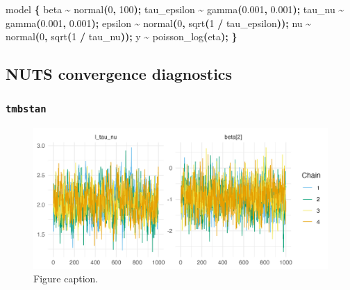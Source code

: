 \documentclass[a4paper, nobind]{templates/ociamthesis}
\newenvironment{Shaded}{\begin{snugshade}}{\end{snugshade}}
\newcommand{\DecValTok}[1]{\textcolor[rgb]{0.00,0.00,0.81}{#1}}
\newcommand{\FloatTok}[1]{\textcolor[rgb]{0.00,0.00,0.81}{#1}}
\newcommand{\NormalTok}[1]{#1}
\newcommand{\OperatorTok}[1]{\textcolor[rgb]{0.81,0.36,0.00}{\textbf{#1}}}
\renewenvironment{Shaded}
{
  \vspace{10pt}%
  \begin{snugshade}%
}{%
  \end{snugshade}%
  \vspace{8pt}%
}
\begin{document}
\begin{Shaded}
\begin{Highlighting}[]
\NormalTok{model }\OperatorTok{\{}
\NormalTok{  beta }\OperatorTok{\textasciitilde{}}\NormalTok{ normal}\OperatorTok{(}\DecValTok{0}\OperatorTok{,} \DecValTok{100}\OperatorTok{);}
\NormalTok{  tau\_epsilon }\OperatorTok{\textasciitilde{}}\NormalTok{ gamma}\OperatorTok{(}\FloatTok{0.001}\OperatorTok{,} \FloatTok{0.001}\OperatorTok{);}
\NormalTok{  tau\_nu }\OperatorTok{\textasciitilde{}}\NormalTok{ gamma}\OperatorTok{(}\FloatTok{0.001}\OperatorTok{,} \FloatTok{0.001}\OperatorTok{);}
\NormalTok{  epsilon }\OperatorTok{\textasciitilde{}}\NormalTok{ normal}\OperatorTok{(}\DecValTok{0}\OperatorTok{,}\NormalTok{ sqrt}\OperatorTok{(}\DecValTok{1} \OperatorTok{/}\NormalTok{ tau\_epsilon}\OperatorTok{));}
\NormalTok{  nu }\OperatorTok{\textasciitilde{}}\NormalTok{ normal}\OperatorTok{(}\DecValTok{0}\OperatorTok{,}\NormalTok{ sqrt}\OperatorTok{(}\DecValTok{1} \OperatorTok{/}\NormalTok{ tau\_nu}\OperatorTok{));}
\NormalTok{  y }\OperatorTok{\textasciitilde{}}\NormalTok{ poisson\_log}\OperatorTok{(}\NormalTok{eta}\OperatorTok{);}
\OperatorTok{\}}
\end{Highlighting}
\end{Shaded}

\hypertarget{nuts-convergence-diagnostics}{%
\subsection{NUTS convergence diagnostics}\label{nuts-convergence-diagnostics}}

\hypertarget{tmbstan-epil}{%
\subsubsection{\texorpdfstring{\texttt{tmbstan}}{tmbstan}}\label{tmbstan-epil}}



\begin{figure}
\includegraphics[width=0.95\linewidth]{figures/naomi-aghq/tmbstan-epil} \caption{Figure caption.}\label{fig:tmbstan-epil}
\end{figure}
\end{document}

